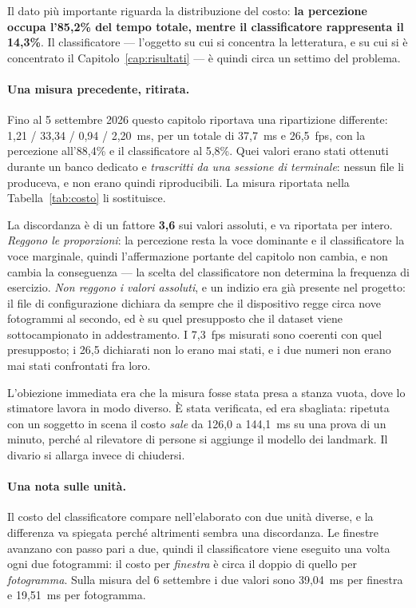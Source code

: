 Il dato più importante riguarda la distribuzione del costo: \textbf{la percezione occupa l'85,2\% del tempo totale, mentre il classificatore rappresenta il 14,3\%}. Il classificatore --- l'oggetto su cui si concentra la letteratura, e su cui si è concentrato il Capitolo~\ref{cap:risultati} --- è quindi circa un settimo del problema.

\paragraph{Una misura precedente, ritirata.} Fino al 5 settembre 2026 questo capitolo riportava una ripartizione differente: 1,21 / 33,34 / 0,94 / 2,20~ms, per un totale di 37,7~ms e 26,5~fps, con la percezione all'88,4\% e il classificatore al 5,8\%. Quei valori erano stati ottenuti durante un banco dedicato e \emph{trascritti da una sessione di terminale}: nessun file li produceva, e non erano quindi riproducibili. La misura riportata nella Tabella~\ref{tab:costo} li sostituisce.

La discordanza è di un fattore \textbf{3,6} sui valori assoluti, e va riportata per intero. \emph{Reggono le proporzioni}: la percezione resta la voce dominante e il classificatore la voce marginale, quindi l'affermazione portante del capitolo non cambia, e non cambia la conseguenza --- la scelta del classificatore non determina la frequenza di esercizio. \emph{Non reggono i valori assoluti}, e un indizio era già presente nel progetto: il file di configurazione dichiara da sempre che il dispositivo regge circa nove fotogrammi al secondo, ed è su quel presupposto che il dataset viene sottocampionato in addestramento. I 7,3~fps misurati sono coerenti con quel presupposto; i 26,5 dichiarati non lo erano mai stati, e i due numeri non erano mai stati confrontati fra loro.

L'obiezione immediata era che la misura fosse stata presa a stanza vuota, dove lo stimatore lavora in modo diverso. È stata verificata, ed era sbagliata: ripetuta con un soggetto in scena il costo \emph{sale} da 126,0 a 144,1~ms su una prova di un minuto, perché al rilevatore di persone si aggiunge il modello dei landmark. Il divario si allarga invece di chiudersi.

\paragraph{Una nota sulle unità.} Il costo del classificatore compare nell'elaborato con due unità diverse, e la differenza va spiegata perché altrimenti sembra una discordanza. Le finestre avanzano con passo pari a due, quindi il classificatore viene eseguito una volta ogni due fotogrammi: il costo per \emph{finestra} è circa il doppio di quello per \emph{fotogramma}. Sulla misura del 6 settembre i due valori sono 39,04~ms per finestra e 19,51~ms per fotogramma.

